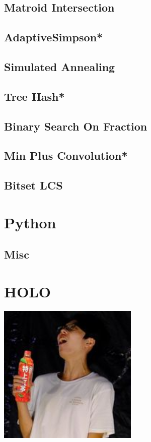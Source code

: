 \subsection{Matroid Intersection}

\subsection{AdaptiveSimpson*} %

\subsection{Simulated Annealing}

\subsection{Tree Hash*} %

\subsection{Binary Search On Fraction}

\subsection{Min Plus Convolution*} %

\subsection{Bitset LCS}

% 


\section{Python}
\subsection{Misc}



\section{HOLO}
\includegraphics[width=0.5\textwidth]{NYCU_HOLO.jpg}
